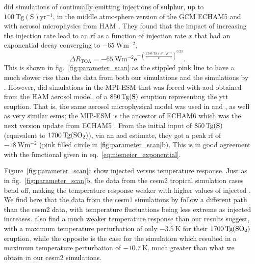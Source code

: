 \documentclass{ametsocV6.1}
\newcommand{\iso}[1][i]{{#1}njected \ce{SO2}}
\begin{document}
\citet{niemeier2015} did simulations of continually emitting injections of sulphur, up
to \(\SI{100}{\tera\gram \mathrm{(S)}\mathrm{yr}^{-1}}\), in the middle atmosphere
version of the GCM ECHAM5 \citep{giorgetta2006} and with aerosol microphysics from HAM
\citep{stier2005}. They found that the impact of increasing the injection rate lead to
an \gls{rf} as a function of injection rate \(x\) that had an exponential decay
converging to \(\SI{-65}{\watt\meter^{-2}}\),
\begin{equation}
  \Delta
  R_{\mathrm{TOA}} =
  -\SI{65}{\watt\metre^{-2}}
  \mathrm{e}^{-{\left(\frac{\SI{2246}{\tera\gram(S)yr^{-1}}}{x}\right)}^{0.23}}.
  \label{eq:niemeier_exponential}
\end{equation}
This is shown in fig.~\ref{fig:parameter_scan} as the stippled pink line to have a much
slower rise than the data from both our simulations and the simulations by
\citet{ottobliesner2016}. However, \citet{timmreck2010} did simulations in the MPI-ESM
that was forced with \gls{aod} obtained from the HAM aerosol model, of a
\(\SI{850}{\tera\gram(\ce{S})}\) eruption representing the \gls{ytt} eruption. That is,
the same aerosol microphysical model was used in \citet{timmreck2010} and
\citet{niemeier2015}, as well as very similar \glspl{esm}; the MIP-ESM is the ancestor
of ECHAM6 which was the next version update from ECHAM5 \citep{kuma2023}. From the
initial input of \(\SI{850}{\tera\gram(\ce{S})}\) (equivalent to
\(\SI{1700}{\tera\gram(\ce{SO2})}\)), via an \gls{aod} estimate, they got a peak
\gls{rf} of \(\SI{-18}{\watt\metre^{-2}}\) (pink filled circle in
\ref{fig:parameter_scan}b). This is in good agreement with the functional given in
eq.~\ref{eq:niemeier_exponential}.

Figure~\ref{fig:parameter_scan}c show \iso{} versus temperature response. Just as in
fig.~\ref{fig:parameter_scan}b, the data from the \gls{cesm2} tropical simulation cases
bend off, making the temperature response weaker with higher values of \iso{}. We find
here that the data from the \gls{cesm1} simulations by \citet{ottobliesner2016} follow a
different path than the \gls{cesm2} data, with temperature fluctuations being less
extreme as \iso{} increases. \citet{timmreck2010} also find a much weaker temperature
response than our results suggest, with a maximum temperature perturbation of only
\(\SI{-3.5}{\kelvin}\) for their \(\SI{1700}{\tera\gram(\ce{SO2})}\) eruption, while the
opposite is the case for the \citet{jones2005} simulation which resulted in a maximum
temperature perturbation of \(\SI{-10.7}{\kelvin}\), much greater than what we obtain in
our \gls{cesm2} simulations.
\end{document}
